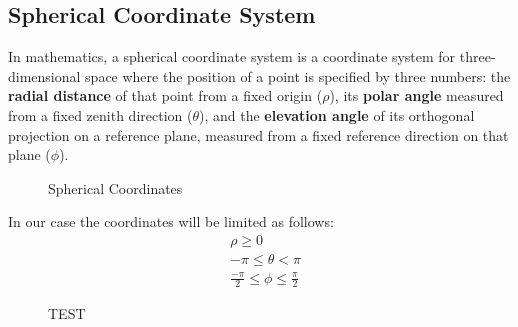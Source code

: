 \subsection*{Spherical Coordinate System}

In mathematics, a spherical coordinate system is a coordinate system for three-dimensional space where the position of a point is specified by three numbers: the \textbf{radial distance} of that point from a fixed origin ($\rho$), its \textbf{polar angle} measured from a fixed zenith direction ($\theta$), and the \textbf{elevation angle} of its orthogonal projection on a reference plane, measured from a fixed reference direction on that plane ($\phi$).

\begin{figure}[H]
   \centering
     
    \label{fig:Spherical1}
    \caption{Spherical Coordinates}
\end{figure}
In our case the coordinates will be limited as follows:
\begin{align*}
& \rho \geq 0 \\
& -\pi \leq \theta < \pi\\
& \frac{-\pi}{2} \leq \phi \leq \frac{\pi}{2}
\label{eq:los_distToHorizon}
\end{align*} 

\begin{figure}[H]
   \centering
     
    \label{fig:TEST}
    \caption{TEST}
\end{figure}
